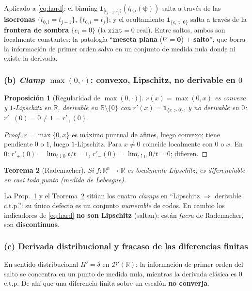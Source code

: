\documentclass[11pt,a4paper]{article}
\theoremstyle{plain}
\newtheorem{theorem}{Teorema}
\newtheorem{proposition}[theorem]{Proposici\'on}
\theoremstyle{definition}
\newcommand{\vect}[1]{\boldsymbol{#1}}
\newcommand{\R}{\mathbb{R}}
\begin{document}
Aplicado a \eqref{eq:hard}: el binning $\mathbf
1_{[t_{j-1},t_j)}(t_{0,i}(\vect{\psi}))$ salta a trav\'es de las
\textbf{isocronas} $\{t_{0,i}=t_{j-1}\}$, $\{t_{0,i}=t_j\}$; y el ocultamiento
$\mathbf 1_{\{e_i>0\}}$ salta a trav\'es de la \textbf{frontera de sombra}
$\{e_i=0\}$ (la $\texttt{xint}=0$ real). Entre saltos, ambos son localmente
constantes: la patolog\'ia ``\textbf{meseta plana} ($\nabla=\vect0$) $+$
\textbf{salto}'', que borra la informaci\'on de primer orden salvo en un conjunto
de medida nula donde ni existe la derivada.

\subsubsection*{(b) \emph{Clamp} $\max(0,\cdot)$: convexo, Lipschitz, no derivable en $0$}

\begin{proposition}[Regularidad de $\max(0,\cdot)$]\label{prop:relu}
$r(x)=\max(0,x)$ es convexa y $1$-Lipschitz en $\R$, derivable en
$\R\setminus\{0\}$ con $r'(x)=\mathbf{1}_{\{x>0\}}$, y \emph{no} derivable en $0$:
$r'_-(0)=0\neq1=r'_+(0)$.
\end{proposition}
\begin{proof}
$r=\max\{0,x\}$ es m\'aximo puntual de afines, luego convexo; tiene pendiente $0$
o $1$, luego $1$-Lipschitz. Para $x\neq0$ coincide localmente con $0$ o $x$. En
$0$: $r'_+(0)=\lim_{t\downarrow0}t/t=1$, $r'_-(0)=\lim_{t\uparrow0}0/t=0$; difieren.
\end{proof}

\begin{theorem}[Rademacher]\label{thm:rademacher}
Si $f:\R^n\to\R$ es localmente Lipschitz, es diferenciable en casi todo punto
(medida de Lebesgue).
\end{theorem}

La Prop.~\ref{prop:relu} y el Teorema~\ref{thm:rademacher} sit\'uan los cuatro
\emph{clamps} en ``Lipschitz $\Rightarrow$ derivable c.t.p.'': su \'unico defecto
es un conjunto \emph{numerable} de codos. En cambio los indicadores de
\eqref{eq:hard} \textbf{no son Lipschitz} (saltan): est\'an \emph{fuera} de
Rademacher, son \textbf{discontinuos}.

\subsubsection*{(c) Derivada distribucional y fracaso de las diferencias finitas}

En sentido distribucional $H'=\delta$ en $\mathcal{D}'(\R)$: la informaci\'on de
primer orden del salto se concentra en un punto de medida nula, mientras la
derivada cl\'asica es $0$ c.t.p. De ah\'i que una diferencia finita sobre un
escal\'on \textbf{no converja}.
\end{document}
